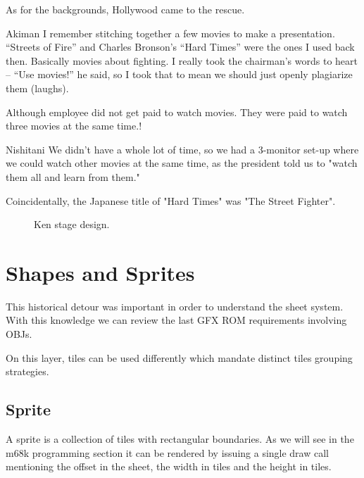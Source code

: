
As for the backgrounds, Hollywood came to the rescue.

\begin{q}{Akiman\cite{ffdevinterview}}
I remember stitching together a few movies to make a presentation. “Streets of Fire” and Charles Bronson’s “Hard Times” were the ones I used back then. Basically movies about fighting. I really took the chairman’s words to heart – “Use movies!” he said, so I took that to mean we should just openly plagiarize them (laughs).
\end{q}

Although employee did not get paid to watch movies. They were paid to watch three movies at the same time.!

\begin{q}{Nishitani\cite{ffdevinterview}}
We didn't have a whole lot of time, so we had a 3-monitor set-up where we could watch other movies at the same time, as the president told us to "watch them all and learn from them."
\end{q}

\begin{trivia}
Coincidentally, the Japanese title of "Hard Times" was "The Street Fighter".
\end{trivia}

 \begin{figure}[H]
\caption*{Ken stage design\cite{sf2completefiles}.}
\end{figure}

\section{Shapes and Sprites}
This historical detour was important in order to understand the sheet system. With this knowledge we can review the last GFX ROM requirements involving OBJs.  

On this layer, tiles can be used differently which mandate distinct tiles grouping strategies.

\subsection{Sprite}
A sprite is a collection of tiles with rectangular boundaries. As we will see in the m68k programming section it can be rendered by issuing a single draw call mentioning the offset in the sheet, the width in tiles and the height in tiles.

